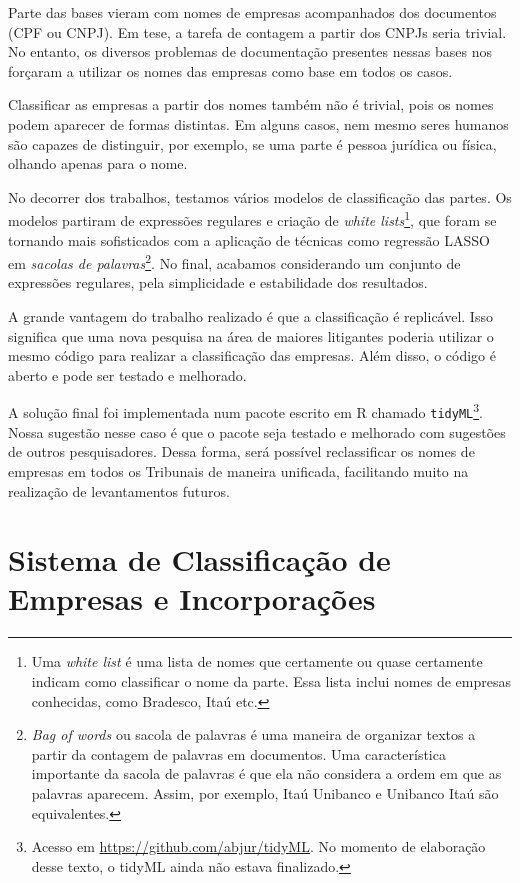 \documentclass[]{report}
\begin{document}
Parte das bases vieram com nomes de empresas acompanhados dos documentos
(CPF ou CNPJ). Em tese, a tarefa de contagem a partir dos CNPJs seria
trivial. No entanto, os diversos problemas de documentação presentes
nessas bases nos forçaram a utilizar os nomes das empresas como base em
todos os casos.

Classificar as empresas a partir dos nomes também não é trivial, pois os
nomes podem aparecer de formas distintas. Em alguns casos, nem mesmo
seres humanos são capazes de distinguir, por exemplo, se uma parte é
pessoa jurídica ou física, olhando apenas para o nome.

No decorrer dos trabalhos, testamos vários modelos de classificação das
partes. Os modelos partiram de expressões regulares e criação de
\emph{white lists}\footnote{Uma \emph{white list} é uma lista de nomes
  que certamente ou quase certamente indicam como classificar o nome da
  parte. Essa lista inclui nomes de empresas conhecidas, como Bradesco,
  Itaú etc.}, que foram se tornando mais sofisticados com a aplicação de
técnicas como regressão LASSO \citep{friedman2001elements} em
\emph{sacolas de palavras}\footnote{\emph{Bag of words} ou sacola de
  palavras é uma maneira de organizar textos a partir da contagem de
  palavras em documentos. Uma característica importante da sacola de
  palavras é que ela não considera a ordem em que as palavras aparecem.
  Assim, por exemplo, Itaú Unibanco e Unibanco Itaú são equivalentes.}.
No final, acabamos considerando um conjunto de expressões regulares,
pela simplicidade e estabilidade dos resultados.

A grande vantagem do trabalho realizado é que a classificação é
replicável. Isso significa que uma nova pesquisa na área de maiores
litigantes poderia utilizar o mesmo código para realizar a classificação
das empresas. Além disso, o código é aberto e pode ser testado e
melhorado.

A solução final foi implementada num pacote escrito em R chamado
\texttt{tidyML}\footnote{Acesso em
  \url{https://github.com/abjur/tidyML}. No momento de elaboração desse
  texto, o tidyML ainda não estava finalizado.}. Nossa sugestão nesse
caso é que o pacote seja testado e melhorado com sugestões de outros
pesquisadores. Dessa forma, será possível reclassificar os nomes de
empresas em todos os Tribunais de maneira unificada, facilitando muito
na realização de levantamentos futuros.

\section{Sistema de Classificação de Empresas e
Incorporações}\label{sistema-de-classificacao-de-empresas-e-incorporacoes}
\end{document}
